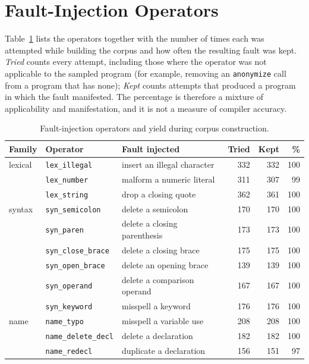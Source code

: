 \documentclass[conference]{IEEEtran}
\newcommand{\code}[1]{\texttt{#1}}
\begin{document}
\section{Fault-Injection Operators}\label{app:ops}

Table~\ref{tab:ops} lists the operators together with the number of times each was attempted while building the
corpus and how often the resulting fault was kept. \emph{Tried} counts every attempt, including those where the
operator was not applicable to the sampled program (for example, removing an \code{anonymize} call from a program
that has none); \emph{Kept} counts attempts that produced a program in which the fault manifested. The percentage is
therefore a mixture of applicability and manifestation, and it is not a measure of compiler accuracy.

\begin{table}[t]
\centering
\caption{Fault-injection operators and yield during corpus construction.}\label{tab:ops}
\scriptsize
\begin{tabular}{llp{5.2cm}rrr}
\toprule
\textbf{Family} & \textbf{Operator} & \textbf{Fault injected} & \textbf{Tried} & \textbf{Kept} & \textbf{\%}\\
\midrule
lexical & \texttt{lex\_illegal} & insert an illegal character & 332 & 332 & 100\\
 & \texttt{lex\_number} & malform a numeric literal & 311 & 307 & 99\\
 & \texttt{lex\_string} & drop a closing quote & 362 & 361 & 100\\
\midrule
syntax & \texttt{syn\_semicolon} & delete a semicolon & 170 & 170 & 100\\
 & \texttt{syn\_paren} & delete a closing parenthesis & 173 & 173 & 100\\
 & \texttt{syn\_close\_brace} & delete a closing brace & 175 & 175 & 100\\
 & \texttt{syn\_open\_brace} & delete an opening brace & 139 & 139 & 100\\
 & \texttt{syn\_operand} & delete a comparison operand & 167 & 167 & 100\\
 & \texttt{syn\_keyword} & misspell a keyword & 176 & 176 & 100\\
\midrule
name & \texttt{name\_typo} & misspell a variable use & 208 & 208 & 100\\
 & \texttt{name\_delete\_decl} & delete a declaration & 182 & 182 & 100\\
 & \texttt{name\_redecl} & duplicate a declaration & 156 & 151 & 97\\

\end{tabular}
\end{table}
\end{document}

